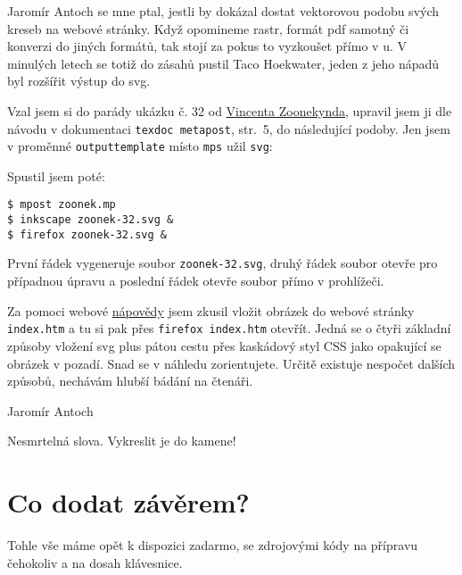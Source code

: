 Jaromír Antoch se mne ptal, jestli by dokázal dostat vektorovou podobu svých kreseb na webové stránky. Když opomineme rastr, formát pdf samotný či konverzi do jiných formátů, tak stojí za pokus to vyzkoušet přímo v \MP u. V minulých letech se totiž do zásahů pustil Taco Hoekwater, jeden z jeho nápadů byl rozšířit výstup do svg.

Vzal jsem si do parády ukázku č. 32 od 
\href{http://zoonek.free.fr/LaTeX/Metapost/metapost.html}{Vincenta Zoonekynda}, upravil jsem ji dle návodu v dokumentaci \texttt{texdoc metapost}, str.~5, do následující podoby. Jen jsem v proměnné \texttt{outputtemplate} místo \texttt{mps} užil \texttt{svg}:



Spustil jsem poté:
\begin{lstlisting}
$ mpost zoonek.mp
$ inkscape zoonek-32.svg &
$ firefox zoonek-32.svg &
\end{lstlisting}

První řádek vygeneruje soubor \texttt{zoonek-32.svg}, druhý řádek soubor otevře pro případnou úpravu a poslední řádek otevře soubor přímo v prohlížeči.

Za pomoci webové
\href{https://vecta.io/blog/best-way-to-embed-svg}{nápovědy} jsem zkusil vložit obrázek do webové stránky \texttt{index.htm} a tu si pak přes \texttt{firefox index.htm} otevřít. Jedná se o čtyři základní způsoby vložení svg plus  pátou cestu přes kaskádový styl CSS jako opakující se obrázek v pozadí. Snad se v náhledu zorientujete.
Určitě existuje nespočet dalších způsobů, nechávám hlubší bádání na čtenáři. 



\noindent\hfil
{}
\smallskip


\textit{}

\hfill Jaromír Antoch

Nesmrtelná slova. Vykreslit je do kamene!



\section{Co dodat závěrem?}
Tohle vše máme opět k dispozici zadarmo, se zdrojovými kódy na přípravu čehokoliv a na dosah klávesnice.

